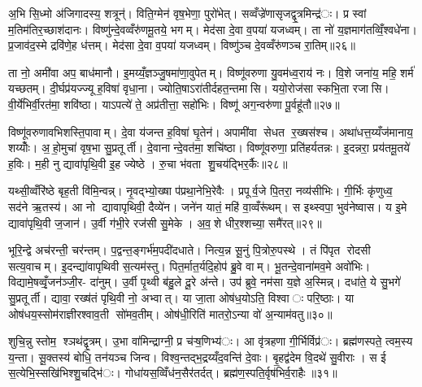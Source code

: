 अ॒भि सि॒ध्मो अ॑जिगादस्य॒ शत्रून्॑। विति॒ग्मेन॑ वृष॒भेणा॒ पुरो॑भेत्। सव्वँज्रे॑णासृजद्वृ॒त्रमिन्द्र॑ः। प्र स्वां म॒तिम॑तिर॒च्छाश॑दानः। विष्णु॑न्दे॒वव्वँरु॑णमू॒तये॒ भगम्। मेद॑सा दे॒वा व॒पया॑ यजध्वम्। ता नो॑ य॒ज्ञमाग॑तव्विँ॒श्वधे॑ना। प्र॒जाव॑द॒स्मे द्रवि॑णे॒ह ध॑त्तम्। मेद॑सा दे॒वा व॒पया॑ यजध्वम्। विष्णु॑ञ्च दे॒वव्वँरु॑णञ्च रा॒तिम्॥२६॥

ता नो॒ अमी॑वा अप॒ बाध॑मानौ। इ॒मय्यँ॒ज्ञञ्जु॒षमा॑णा॒वुपेतम्। विष्णू॑वरुणा यु॒वम॑ध्व॒राय॑ नः। वि॒शे जना॑य॒ महि॒ शर्म॑ यच्छतम्। दी॒र्घप्र॑यज्ज्यू ह॒विषा॑ वृधा॒ना। ज्योति॒षाऽरा॑तीर्दहत॒न्तमासि। ययो॒रोज॑सा स्कभि॒ता रजासि। वी॒र्ये॑भिर्वी॒रत॑मा॒ शवि॑ष्ठा। याऽपत्ये॑ ते॒ अप्र॑तीत्ता॒ सहो॑भिः। विष्णू॑ अग॒न्वरु॑णा पू॒र्वहू॑तौ॥२७॥

विष्णू॑वरुणावभिशस्ति॒पावाम्। दे॒वा य॑जन्त ह॒विषा॑ घृ॒तेन॑। अपामी॑वा सेधत र॒ख्षस॑श्च। अथा॑धत्त॒य्यँज॑मानाय॒ शय्योँः। अ॒हो॒मुचा॑ वृष॒भा सु॒प्रतूर्ती। दे॒वानान्दे॒वत॑मा॒ शचि॑ष्ठा। विष्णू॑वरुणा॒ प्रति॑हर्यतन्नः। इ॒दन्नरा॒ प्रय॑तमू॒तये॑ ह॒विः। म॒ही नु द्यावा॑पृथि॒वी इ॒ह ज्येष्ठे। रु॒चा भ॑वता शु॒चय॑द्भिर॒र्कैः॥२८॥

यथ्सी॒व्वँरि॑ष्ठे बृह॒ती वि॑मि॒न्वन्न्। नृ॒वद्भ्यो॒ख्षा प॑प्रथा॒नेभि॒रेवैः। प्रपूर्व॒जे पि॒तरा॒ नव्य॑सीभिः। गी॒र्भिः कृ॑णुध्व॒ सद॑ने ऋ॒तस्य॑। आ नो द्यावापृथिवी॒ दैव्ये॑न। जने॑न यातं॒ महि॑ वा॒व्वँरू॑थम्। स इथ्स्वपा॒ भुव॑नेष्वास। य इ॒मे द्यावा॑पृथि॒वी ज॒जान॑। उ॒र्वी ग॑भी॒रे रज॑सी सु॒मेके। अ॒व॒शे धीर॒श्शच्या॒ समै॑रत्॥२९॥

भूरि॒न्द्वे अच॑रन्ती॒ चर॑न्तम्। प॒द्वन्त॒ङ्गर्भ॑म॒पदी॑दधाते। नित्य॒न्न सू॒नुं पि॒त्रोरु॒पस्थे। तं पि॑पृत रोदसी सत्य॒वाचम्। इ॒दन्द्या॑वापृथिवी स॒त्यम॑स्तु। पित॒र्मात॒र्यदि॒होप॑ ब्रु॒वे वाम्। भू॒तन्दे॒वाना॑मव॒मे अवो॑भिः। विद्यामे॒षव्वृँ॒जन॑ञ्जी॒र- दा॑नुम्। उ॒र्वी पृ॒थ्वी ब॑हु॒ले दू॒रे अ॑न्ते। उप॑ ब्रुवे॒ नम॑सा य॒ज्ञे अ॒स्मिन्न्। दधा॑ते॒ ये सु॒भगे॑ सु॒प्रतूर्ती। द्यावा॒ रख्ष॑तं पृथि॒वी नो॒ अभ्वात्। या जा॒ता ओष॑ध॒योऽति॒ विश्वाः परि॒ष्ठाः। या ओष॑धय॒स्सोम॑राज्ञीरश्वाव॒ती सो॑मव॒तीम्। ओष॑धी॒रिति॑ मातरो॒ऽन्या वो॑ अ॒न्याम॑वतु॥३०॥


शुचि॒न्नु स्तोम॒ श्ञथ॑द्वृ॒त्रम्। उ॒भा वा॑मिन्द्राग्नी॒ प्र च॑ऱ्ष॒णिभ्य॑ः। आ वृ॑त्रहणा गी॒र्भिर्विप्र॑ः। ब्रह्म॑णस्पते॒ त्वम॒स्य य॒न्ता। सू॒क्तस्य॑ बोधि॒ तन॑यञ्च जिन्व। विश्व॒न्तद्भ॒द्रय्यँद॒वन्ति॑ दे॒वाः। बृ॒हद्व॑देम वि॒दथे॑ सु॒वीराः। स ई स॒त्येभि॒स्सखि॑भिश्शु॒चद्भि॑ः। गोधा॑यस॒व्विँध॑न॒सैर॑तर्दत्। ब्रह्म॑ण॒स्पति॒र्वृष॑भिर्व॒राहैः॥३१॥

